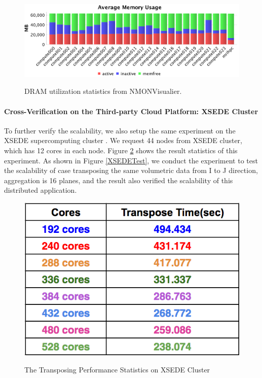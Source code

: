 \begin{figure}[h]
\centering
\includegraphics[scale=0.6]{figures/NMONMemory.png}\\
\caption{DRAM utilization statistics from NMONVisualier.}\label{NMONMEM}
\end{figure}

\paragraph{Cross-Verification on the Third-party Cloud Platform: XSEDE Cluster}

To further verify the scalability, we also setup the same experiment on the XSEDE supercomputing cluster \cite{XSEDE}. We request 44 nodes from XSEDE cluster, which has 12 cores in each node. Figure \ref{XSEDETestStat} shows the result statistics of this experiment. As shown in Figure \ref{XSEDETest}, we conduct the experiment to test the scalability of case transposing the same volumetric data from I to J direction, aggregation is 16 planes, and the result also verified the scalability of this distributed application.

\begin{figure}[h]
\centering
\includegraphics[scale=0.6]{figures/XSEDETestStat.png}\\
\caption{The Transposing Performance Statistics on XSEDE Cluster}\label{XSEDETestStat}
\end{figure}

